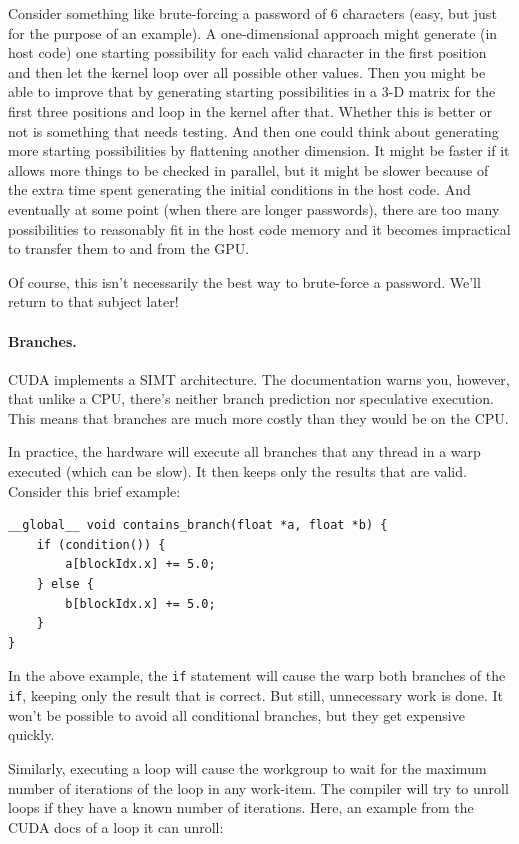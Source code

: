 \documentclass[a4paper]{report}
\begin{document}
Consider something like brute-forcing a password of 6 characters (easy, but just for the purpose of an example). A one-dimensional approach might generate (in host code) one starting possibility for each valid character in the first position and then let the kernel loop over all possible other values. Then you might be able to improve that by generating starting possibilities in a 3-D matrix for the first three positions and loop in the kernel after that. Whether this is better or not is something that needs testing. And then one could think about generating more starting possibilities by flattening another dimension. It might be faster if it allows more things to be checked in parallel, but it might be slower because of the extra time spent generating the initial conditions in the host code. And eventually at some point (when there are longer passwords), there are too many possibilities to reasonably fit in the host code memory and it becomes impractical to transfer them to and from the GPU.

Of course, this isn't necessarily the best way to brute-force a password. We'll return to that subject later!

\paragraph{Branches.} CUDA implements a SIMT architecture. The documentation warns you, however, that unlike a CPU, there's neither branch prediction nor speculative execution. This means that branches are much more costly than they would be on the CPU. 

In practice, the hardware will execute all branches that any thread in
a warp executed (which can be slow). It then keeps only the results that are valid. Consider this brief example:

    \begin{verbatim}
__global__ void contains_branch(float *a, float *b) {
    if (condition()) {
        a[blockIdx.x] += 5.0;
    } else {
        b[blockIdx.x] += 5.0;
    }
}
\end{verbatim}

In the above example, the {\tt if} statement will cause
the warp both branches of the {\tt if}, keeping only the
result that is correct. But still, unnecessary work is done. It won't be possible to avoid all conditional branches, but they get expensive quickly.

Similarly, executing a loop will cause the
workgroup to wait for the maximum number of iterations of the loop in
any work-item. The compiler will try to unroll loops if they have a known number of iterations. Here, an example from the CUDA docs of a loop it can unroll:
\end{document}
